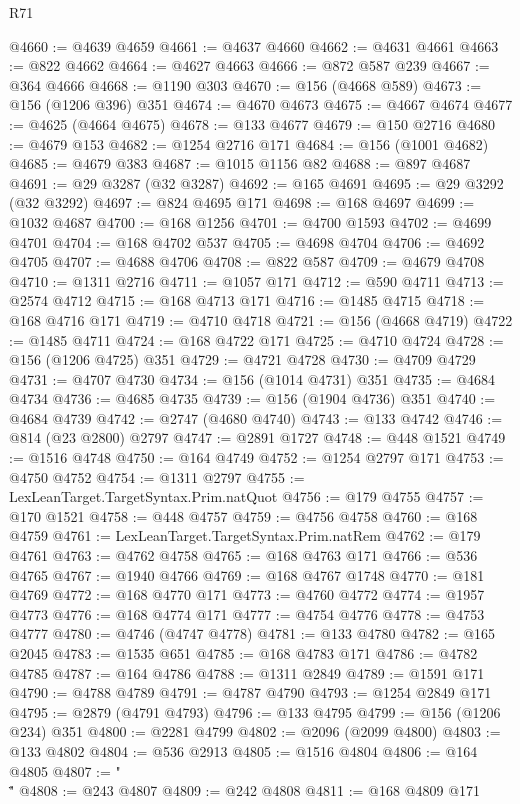 \begin{lexlean}{R71}
\begin{coremodule}
@4660 := @4639 @4659
@4661 := @4637 @4660
@4662 := @4631 @4661
@4663 := @822 @4662
@4664 := @4627 @4663
@4666 := @872 @587 @239
@4667 := @364 @4666
@4668 := @1190 @303
@4670 := @156 (@4668 @589)
@4673 := @156 (@1206 @396) @351
@4674 := @4670 @4673
@4675 := @4667 @4674
@4677 := @4625 (@4664 @4675)
@4678 := @133 @4677
@4679 := @150 @2716
@4680 := @4679 @153
@4682 := @1254 @2716 @171
@4684 := @156 (@1001 @4682)
@4685 := @4679 @383
@4687 := @1015 @1156 @82
@4688 := @897 @4687
@4691 := @29 @3287 (@32 @3287)
@4692 := @165 @4691
@4695 := @29 @3292 (@32 @3292)
@4697 := @824 @4695 @171
@4698 := @168 @4697
@4699 := @1032 @4687
@4700 := @168 @1256
@4701 := @4700 @1593
@4702 := @4699 @4701
@4704 := @168 @4702 @537
@4705 := @4698 @4704
@4706 := @4692 @4705
@4707 := @4688 @4706
@4708 := @822 @587
@4709 := @4679 @4708
@4710 := @1311 @2716
@4711 := @1057 @171
@4712 := @590 @4711
@4713 := @2574 @4712
@4715 := @168 @4713 @171
@4716 := @1485 @4715
@4718 := @168 @4716 @171
@4719 := @4710 @4718
@4721 := @156 (@4668 @4719)
@4722 := @1485 @4711
@4724 := @168 @4722 @171
@4725 := @4710 @4724
@4728 := @156 (@1206 @4725) @351
@4729 := @4721 @4728
@4730 := @4709 @4729
@4731 := @4707 @4730
@4734 := @156 (@1014 @4731) @351
@4735 := @4684 @4734
@4736 := @4685 @4735
@4739 := @156 (@1904 @4736) @351
@4740 := @4684 @4739
@4742 := @2747 (@4680 @4740)
@4743 := @133 @4742
@4746 := @814 (@23 @2800) @2797
@4747 := @2891 @1727
@4748 := @448 @1521
@4749 := @1516 @4748
@4750 := @164 @4749
@4752 := @1254 @2797 @171
@4753 := @4750 @4752
@4754 := @1311 @2797
@4755 := LexLeanTarget.TargetSyntax.Prim.natQuot
@4756 := @179 @4755
@4757 := @170 @1521
@4758 := @448 @4757
@4759 := @4756 @4758
@4760 := @168 @4759
@4761 := LexLeanTarget.TargetSyntax.Prim.natRem
@4762 := @179 @4761
@4763 := @4762 @4758
@4765 := @168 @4763 @171
@4766 := @536 @4765
@4767 := @1940 @4766
@4769 := @168 @4767 @1748
@4770 := @181 @4769
@4772 := @168 @4770 @171
@4773 := @4760 @4772
@4774 := @1957 @4773
@4776 := @168 @4774 @171
@4777 := @4754 @4776
@4778 := @4753 @4777
@4780 := @4746 (@4747 @4778)
@4781 := @133 @4780
@4782 := @165 @2045
@4783 := @1535 @651
@4785 := @168 @4783 @171
@4786 := @4782 @4785
@4787 := @164 @4786
@4788 := @1311 @2849
@4789 := @1591 @171
@4790 := @4788 @4789
@4791 := @4787 @4790
@4793 := @1254 @2849 @171
@4795 := @2879 (@4791 @4793)
@4796 := @133 @4795
@4799 := @156 (@1206 @234) @351
@4800 := @2281 @4799
@4802 := @2096 (@2099 @4800)
@4803 := @133 @4802
@4804 := @536 @2913
@4805 := @1516 @4804
@4806 := @164 @4805
@4807 := "\\\""
@4808 := @243 @4807
@4809 := @242 @4808
@4811 := @168 @4809 @171

\end{coremodule}
\end{lexlean}
